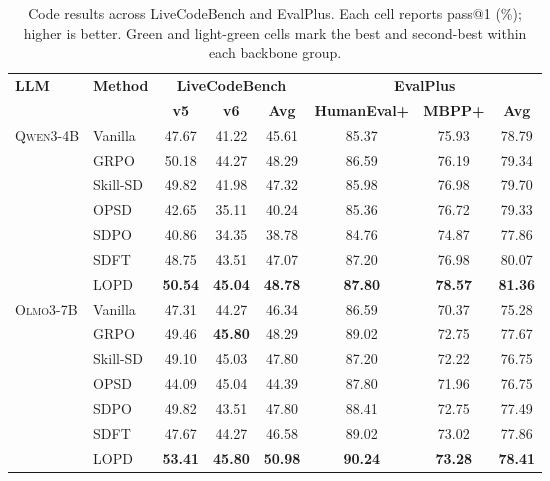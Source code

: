 \documentclass{article} %
\newcommand{\llmname}[1]{\textsc{#1}}
\newcommand{\ourmethod}{{\textsc{LOPD}}\xspace}
\newcommand{\bestcell}[1]{\cellcolor{bestgreen}\textbf{#1}}
\newcommand{\secondcell}[1]{\cellcolor{secondgreen}#1}
\begin{document}
\begin{table}[!t]
\centering
\small
\setlength{\tabcolsep}{9pt}
\renewcommand{\arraystretch}{1.04}
\caption{
Code results across LiveCodeBench and EvalPlus.
Each cell reports pass@1 (\%); higher is better.
Green and light-green cells mark the best and second-best within each backbone group.
}
    \vspace{-0.5em}
\label{tab:code-results}
\begin{tabular}{
ll@{\hspace{0.7em}}
ccc@{\hspace{1.0em}}
ccc
}
\toprule
\multirow{2}{*}{\textbf{LLM}} &
\multirow{2}{*}{\textbf{Method}} &
\multicolumn{3}{c}{\textbf{LiveCodeBench}} &
\multicolumn{3}{c}{\textbf{EvalPlus}} \\
\cmidrule(lr){3-5}
\cmidrule(lr){6-8}
& &
\textbf{v5} & \textbf{v6} & \textbf{Avg}
& \textbf{HumanEval+} & \textbf{MBPP+} & \textbf{Avg} \\
\midrule
\multirow{7}{*}{\llmname{Qwen3-4B}}
& Vanilla
& 47.67 & 41.22 & 45.61
& 85.37 & 75.93 & 78.79 \\
& GRPO
& \secondcell{50.18} & \secondcell{44.27} & \secondcell{48.29}
& 86.59 & 76.19 & 79.34 \\
& Skill-SD
& 49.82 & 41.98 & 47.32
& 85.98 & \secondcell{76.98} & 79.70 \\
& OPSD
& 42.65 & 35.11 & 40.24
& 85.36 & 76.72 & 79.33 \\
& SDPO
& 40.86 & 34.35 & 38.78
& 84.76 & 74.87 & 77.86 \\
& SDFT
& 48.75 & 43.51 & 47.07
& \secondcell{87.20} & \secondcell{76.98} & \secondcell{80.07} \\
& \ourmethod
& \bestcell{50.54} & \bestcell{45.04} & \bestcell{48.78}
& \bestcell{87.80} & \bestcell{78.57} & \bestcell{81.36} \\
\midrule
\multirow{7}{*}{\llmname{Olmo3-7B}}
& Vanilla
& 47.31 & 44.27 & 46.34
& 86.59 & 70.37 & 75.28 \\
& GRPO
& 49.46 & \bestcell{45.80} & \secondcell{48.29}
& \secondcell{89.02} & 72.75 & 77.67 \\
& Skill-SD
& 49.10 & 45.03 & 47.80
& 87.20 & 72.22 & 76.75 \\
& OPSD
& 44.09 & \secondcell{45.04} & 44.39
& 87.80 & 71.96 & 76.75 \\
& SDPO
& \secondcell{49.82} & 43.51 & 47.80
& 88.41 & 72.75 & 77.49 \\
& SDFT
& 47.67 & 44.27 & 46.58
& \secondcell{89.02} & \secondcell{73.02} & \secondcell{77.86} \\
& \ourmethod
& \bestcell{53.41} & \bestcell{45.80} & \bestcell{50.98}
& \bestcell{90.24} & \bestcell{73.28} & \bestcell{78.41} \\
\bottomrule
\end{tabular}
\vspace{-0.6em}
\end{table}
\end{document}
